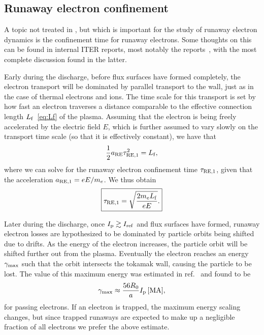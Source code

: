 \documentclass{notes}
\newcommand{\Ip}{I_{\rm p}}
\begin{document}
    \subsection{Runaway electron confinement}
    A topic not treated in \DYON, but which is important for the study of
    runaway electron dynamics is the confinement time for runaway electrons.
    Some thoughts on this can be found in internal ITER reports, most notably
    the reports~\cite{Putvinski2010,Kavin2017,Mineev2021}, with the most
    complete discussion found in the latter.

    Early during the discharge, before flux surfaces have formed completely,
    the electron transport will be dominated by parallel transport to the wall,
    just as in the case of thermal electrons and ions. The time scale for this
    transport is set by how fast an electron traverses a distance comparable to
    the effective connection length $L_{\rm f}$~\eqref{eq:Lf} of the plasma.
    Assuming that the electron is being freely accelerated by the electric
    field $E$, which is further assumed to vary slowly on the transport time
    scale (so that it is effectively constant), we have that
    \begin{equation}
        \frac{1}{2}a_{\rm RE}\tau_{\rm RE,1}^2 = L_{\rm f},
    \end{equation}
    where we can solve for the runaway electron confinement time
    $\tau_{\rm RE,1}$, given that the acceleration $a_{\rm RE,1}=eE/m_e$.
    We thus obtain
    \begin{equation}
        \boxed{
            \tau_{\rm RE,1} = \sqrt{\frac{2m_eL_{\rm f}}{eE}}.
        }
    \end{equation}

    Later during the discharge, once $\Ip\gtrsim I_{\rm ref}$ and flux surfaces
    have formed, runaway electron losses are hypothesized to be dominated by
    particle orbits being shifted due to drifts. As the energy of the electron
    increases, the particle orbit will be shifted further out from the plasma.
    Eventually the electron reaches an energy $\gamma_{\rm max}$ such that the
    orbit intersects the tokamak wall, causing the particle to be lost. The
    value of this maximum energy was estimated in ref.~\cite{Putvinski2010} and
    found to be
    \begin{equation}\label{eq:PutvinskiScaling}
        \gamma_{\rm max} \approx \frac{56R_0}{a}\Ip\,[\si{MA}],
    \end{equation}
    for passing electrons. If an electron is trapped, the maximum energy scaling
    changes, but since trapped runaways are expected to make up a negligible
    fraction of all electrons we prefer the above estimate.
\end{document}
